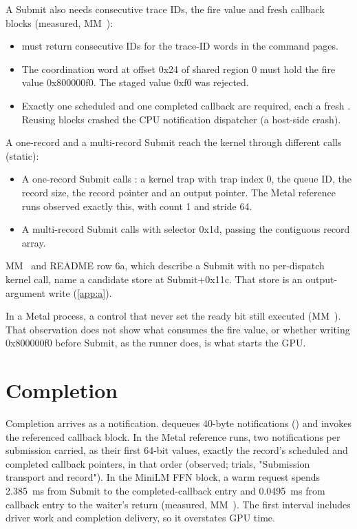 A Submit also needs consecutive trace IDs, the fire value and fresh callback blocks (measured, MM~):

\begin{itemize}
\item {} must return consecutive IDs for the trace-ID words in the command pages.
\item The coordination word at offset 0x24 of shared region 0 must hold the fire value 0x800000f0. The staged value 0xf0 was
  rejected.
\item Exactly one scheduled and one completed callback are required, each a fresh . Reusing blocks crashed the
  CPU notification dispatcher (a host-side crash).
\end{itemize}

A one-record and a multi-record Submit reach the kernel through different calls (static):

\begin{itemize}
\item A one-record Submit calls : a kernel trap with trap index 0, the queue ID, the record size, the record
  pointer and an output pointer. The Metal reference runs observed exactly this, with count 1 and stride 64.
\item A multi-record Submit calls  with selector 0x1d, passing the contiguous record array.
\end{itemize}

MM~ and README row 6a, which describe a Submit with no per-dispatch kernel call, name a candidate store at
Submit+0x11c. That store is an output-argument write (\cref{app:a}).

In a Metal process, a control that never set the ready bit still executed (MM~). That observation does not show what
consumes the fire value, or whether writing 0x800000f0 before Submit, as the runner does, is what starts the GPU.

\section{Completion}\label{sec:completion-callbacks-their}

Completion arrives as a notification.  dequeues
40-byte notifications () and invokes the referenced callback block. In the Metal reference runs,
two notifications per submission carried, as their first 64-bit values, exactly the record's scheduled and completed
callback pointers, in that order (observed; trials, "Submission transport and record"). In the MiniLM FFN block, a warm
request spends 2.385~ms from Submit to the completed-callback entry and 0.0495~ms from callback entry to the waiter's
return (measured, MM~). The first interval includes driver work and completion delivery, so it overstates
GPU time.

